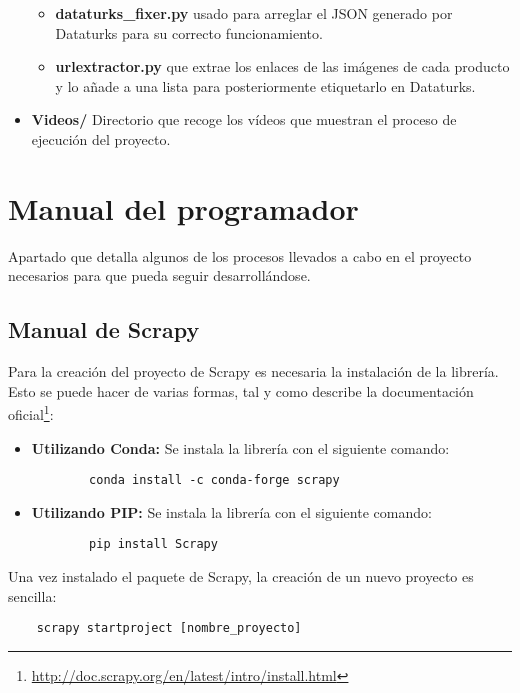\begin{itemize}
\begin{itemize}
            \item \textbf{dataturks\_fixer.py}  usado para arreglar el JSON generado por Dataturks para su correcto funcionamiento.
            \item \textbf{url\-extractor.py}  que extrae los enlaces de las imágenes de cada producto y lo añade a una lista para posteriormente etiquetarlo en Dataturks.
        \end{itemize}
    \item \textbf{Videos/} Directorio que recoge los vídeos que muestran el proceso de ejecución del proyecto.
\end{itemize}

\section{Manual del programador}

Apartado que detalla algunos de los procesos llevados a cabo en el proyecto necesarios para que pueda seguir desarrollándose.

\subsection{Manual de Scrapy}

Para la creación del proyecto de Scrapy es necesaria la instalación de la librería. Esto se puede hacer de varias formas, tal y como describe la documentación oficial\footnote{\url{http://doc.scrapy.org/en/latest/intro/install.html}}:

\begin{itemize}
    \item \textbf{Utilizando Conda:} Se instala la librería con el siguiente comando:
        \begin{verbatim}
        conda install -c conda-forge scrapy
        \end{verbatim}
    \item \textbf{Utilizando PIP:} Se instala la librería con el siguiente comando:
        \begin{verbatim}
        pip install Scrapy
        \end{verbatim}
\end{itemize}

Una vez instalado el paquete de Scrapy, la creación de un nuevo proyecto es sencilla:

\begin{verbatim}
    scrapy startproject [nombre_proyecto]
\end{verbatim}

